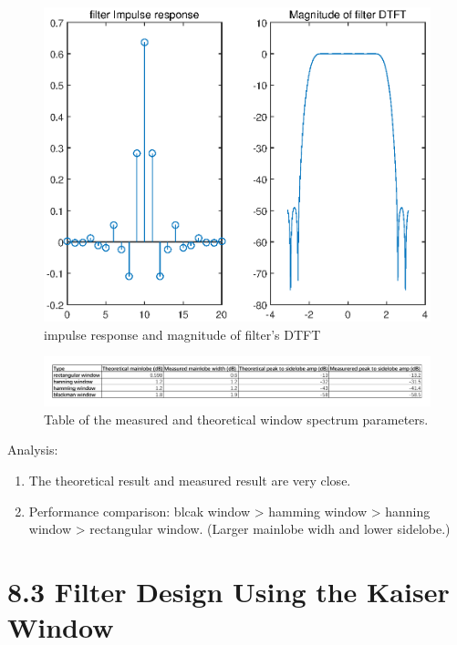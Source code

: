 \documentclass[onecolumn,oneside]{SUSTechHomework}
\begin{document}
\begin{figure}[H]
	\centering
	\includegraphics[width=150mm]{pictures/window3.eps}
	\caption{impulse response and magnitude of filter's DTFT}
\end{figure}
\begin{figure}[H]
	\centering
	\includegraphics[width=180mm]{pictures/表格.pdf}
	Table of the measured and theoretical window spectrum parameters.
\end{figure}
Analysis:
\begin{enumerate}
	\item The theoretical result and measured result are very close.
	\item Performance comparison: blcak window > hamming window > hanning window > rectangular window.
	(Larger mainlobe widh and lower sidelobe.)
\end{enumerate}

\section*{8.3 Filter Design Using the Kaiser Window}
\newpage
\end{document}
